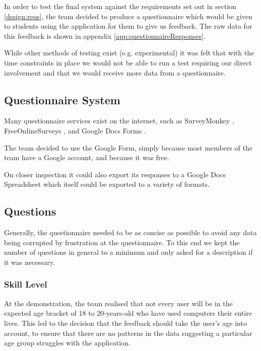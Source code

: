 In order to test the final system against the requirements set out in
section \ref{design:reqs}, the team decided to produce a
questionnaire which would be given to students using the application
for them to give us feedback.
The raw data for this feedback is shown in appendix
\ref{app:questionnaireResponses}.

While other methods of testing exist (e.g. experimental) it was felt
that with the time constraints in place we would not be able to run a
test requiring our direct involvement and that we would receive more
data from a questionnaire.

\subsection{Questionnaire System}

Many questionnaire services exist on the internet, such as
SurveyMonkey \cite{surveyMonkey}, FreeOnlineSurveys
\cite{freeOnlineSurveys}, and Google Docs Forms
\cite{googleDocsForms}.

The team decided to use the Google Form, simply because most members
of the team have a Google account, and because it was free.

On closer inspection it could also export its responses to a Google
Docs Spreadsheet which itself could be exported to a variety of
formats.

\subsection{Questions}

Generally, the questionnaire needed to be as concise as possible to
avoid any data being corrupted by frustration at the questionnaire.
To this end we kept the number of questions in general to a minimum
and only asked for a description if it was necessary.

\subsubsection{Skill Level}
At the demonstration, the team realised that not every user will be in
the expected age bracket of 18 to 20-years-old who have used computers
their entire lives.
This led to the decision that the feedback should take the user's age
into account, to ensure that there are no patterns in the data
suggesting a particular age group struggles with the application.

